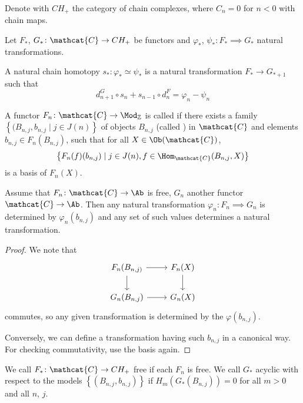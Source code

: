 Denote with $CH_+$ the category of chain complexes,
where  $C_n = 0$ for  $n<0$ with chain maps.

Let $F_*$, $G_*\colon \mathcat{C} \to  CH_+$ be functors
and $\varphi _*$, $\psi _*\colon  F_* \implies G_*$ natural transformations.

\begin{definition}
  A natural chain homotopy $s_* \colon  \varphi _* \simeq \psi _*$
  is a natural transformation $F_* \to  G_{* + 1}$
  such that
  \[
  d_{n+1}^G \circ  s_n + s_{n-1} \circ  d_n^F = \varphi _n - \psi _n
  \] 
\end{definition}

\begin{definition}
  A functor $F_n\colon \mathcat{C} \to \Mod_{\mathbb{Z}}$
  is called  if there exists a family
  $\left\{(B_{n,j}, b_{n,j} \mid  j\in J(n) \right\} $ 
  of objects $B_{n,j}$ (called ) in $\mathcat{C}$
  and elements $b_{n,j} \in F_n(B_{n,j})$,
  such that for all $X\in \Ob(\mathcat{C})$,
  \[
  \left\{F_n(f) (b_{n,j}) \mid  j\in J(n), f\in \Hom_{\mathcat{C}}(B_{n,j},X) \right\} 
  \]
  is a basis of $F_n(X)$.
\end{definition}

\begin{remark}
  Assume that $F_n\colon \mathcat{C} \to  \Ab$ is free,
  $G_n$ another functor  $\mathcat{C} \to  \Ab$.
  Then any natural transformation $\varphi _n \colon F_n \implies G_n$
  is determined by $\varphi _n(b_{n,j})$
  and any set of such values determines a natural transformation.
\end{remark}

\begin{proof}
  We note that
  \[
  \begin{tikzcd}
    F_n(B_{n,j)} \ar[swap]{d}{} \ar{r}{} & F_n(X) \ar{d}{} \\
   G_n(B_{n,j})  \ar[swap]{r}{} & G_n(X)
  \end{tikzcd}
  \]
  commutes, so any given transformation is determined by the $\varphi (b_{n,j})$.

  Conversely, we can define a transformation having such $b_{n,j}$
  in a canonical way.
  For checking commutativity, use the basis again.
\end{proof}

\begin{definition}
  We call $F_* \colon  \mathcat{C} \to  CH_+$ free if each $F_n$ is free.
  We call  $G_*$ acyclic with respect to the models
   $\left\{(B_{n,j}, b_{n,j})\right\} $ 
   if $H_m(G_*(B_{n,j})) = 0$ for all $m>0$ and all $n$,  $j$.
\end{definition}


